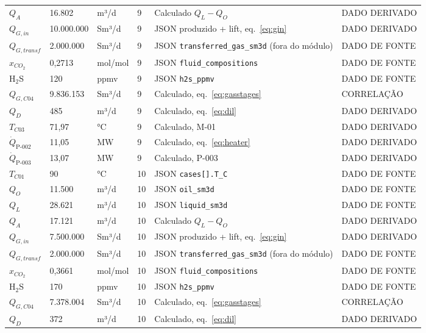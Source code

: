 \documentclass[11pt,a4paper]{article}
\numberwithin{equation}{section}
\numberwithin{table}{section}
\numberwithin{figure}{section}
\newcommand{\tipo}[1]{\textsf{\footnotesize #1}}
\begin{document}
{\begin{longtable}{L{3.6cm}L{2.2cm}lL{1.0cm}L{4.2cm}l}
$Q_{A}$ & 16.802 & m³/d & 9 & Calculado $Q_L-Q_O$ & \tipo{DADO DERIVADO}\\
$Q_{G,in}$ & 10.000.000 & Sm³/d & 9 & JSON produzido + lift, eq.~\eqref{eq:gin} & \tipo{DADO DERIVADO}\\
$Q_{G,transf}$ & 2.000.000 & Sm³/d & 9 & JSON \texttt{transferred\_gas\_sm3d} (fora do módulo) & \tipo{DADO DE FONTE}\\
$x_{CO_2}$ & 0{,}2713 & mol/mol & 9 & JSON \texttt{fluid\_compositions} & \tipo{DADO DE FONTE}\\
H$_2$S & 120 & ppmv & 9 & JSON \texttt{h2s\_ppmv} & \tipo{DADO DE FONTE}\\
$Q_{G,C04}$ & 9.836.153 & Sm³/d & 9 & Calculado, eq.~\eqref{eq:gasstages} & \tipo{CORRELAÇÃO}\\
$Q_{D}$ & 485 & m³/d & 9 & Calculado, eq.~\eqref{eq:dil} & \tipo{DADO DERIVADO}\\
$T_{C03}$ & 71,97 & °C & 9 & Calculado, M-01 & \tipo{DADO DERIVADO}\\
$\dot Q_{\mbox{P-002}}$ & 11,05 & MW & 9 & Calculado, eq.~\eqref{eq:heater} & \tipo{DADO DERIVADO}\\
$\dot Q_{\mbox{P-003}}$ & 13,07 & MW & 9 & Calculado, P-003 & \tipo{DADO DERIVADO}\\
$T_{C01}$ & 90 & °C & 10 & JSON \texttt{cases[].T\_C} & \tipo{DADO DE FONTE}\\
$Q_{O}$ & 11.500 & m³/d & 10 & JSON \texttt{oil\_sm3d} & \tipo{DADO DE FONTE}\\
$Q_{L}$ & 28.621 & m³/d & 10 & JSON \texttt{liquid\_sm3d} & \tipo{DADO DE FONTE}\\
$Q_{A}$ & 17.121 & m³/d & 10 & Calculado $Q_L-Q_O$ & \tipo{DADO DERIVADO}\\
$Q_{G,in}$ & 7.500.000 & Sm³/d & 10 & JSON produzido + lift, eq.~\eqref{eq:gin} & \tipo{DADO DERIVADO}\\
$Q_{G,transf}$ & 2.000.000 & Sm³/d & 10 & JSON \texttt{transferred\_gas\_sm3d} (fora do módulo) & \tipo{DADO DE FONTE}\\
$x_{CO_2}$ & 0{,}3661 & mol/mol & 10 & JSON \texttt{fluid\_compositions} & \tipo{DADO DE FONTE}\\
H$_2$S & 170 & ppmv & 10 & JSON \texttt{h2s\_ppmv} & \tipo{DADO DE FONTE}\\
$Q_{G,C04}$ & 7.378.004 & Sm³/d & 10 & Calculado, eq.~\eqref{eq:gasstages} & \tipo{CORRELAÇÃO}\\
$Q_{D}$ & 372 & m³/d & 10 & Calculado, eq.~\eqref{eq:dil} & \tipo{DADO DERIVADO}\\

\end{longtable}}
\end{document}
